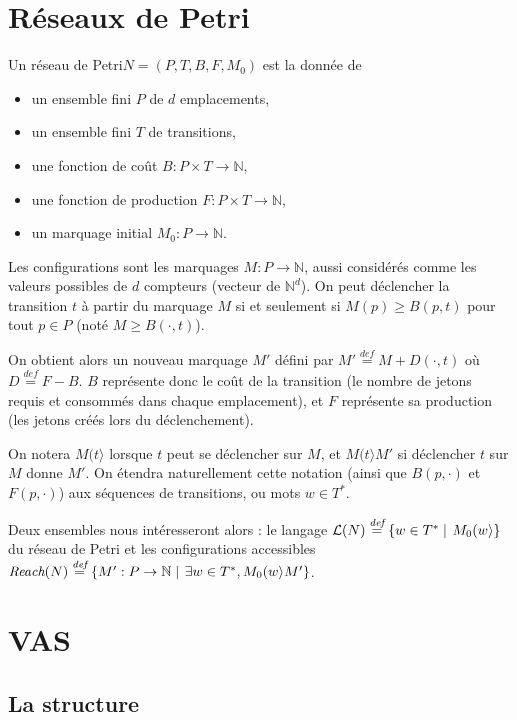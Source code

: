 \documentclass[a4paper,final]{article}
\theoremstyle{definition}
\let\geq\geqslant
\newcommand{\set}[2]{\left\{#1\mathrel{\left|\vphantom{#1}\vphantom{#2}\right.}#2\right\}}
\newcommand{\defeq}{\ensuremath{\stackrel{\textit{def}}{=}}}
\newcommand{\N}{\ensuremath{\mathbb{N}}}
\newcommand{\petri}{réseau de Petri\xspace}
\newcommand{\fire}[2]{\ensuremath{#1 (#2\rangle}}
\newcommand{\lang}{\ensuremath{\mathcal{L}}}
\newcommand{\reach}{\ensuremath{\textit{Reach}}}
\begin{document}
\section{Réseaux de Petri}

Un \petri $N = (P,T,B,F,M_0)$ est la donnée de
\begin{itemize}
    \item un ensemble fini $P$ de $d$ emplacements,
    \item un ensemble fini $T$ de transitions,
    \item une fonction de coût $B: P\times T\to\N$,
    \item une fonction de production $F: P\times T\to\N$,
    \item un marquage initial $M_0: P\to\N$.
\end{itemize}

Les configurations sont les marquages $M: P\to\N$, aussi considérés comme les valeurs possibles de $d$ compteurs (vecteur de $\N^d$).
On peut déclencher la transition $t$ à partir du marquage $M$ si et
seulement si $M(p)\geq B(p,t)$ pour tout $p\in P$ (noté $M\geq B(\cdot,t)$).

On obtient alors un nouveau marquage $M'$ défini par $M' \defeq M+D(\cdot,t)$ où $D\defeq F-B$. 
$B$ représente donc le coût de la transition (le nombre de jetons requis et consommés dans chaque emplacement), et $F$ représente sa production (les jetons créés lors du déclenchement).

On notera $\fire{M}{t}$ lorsque $t$ peut se déclencher sur $M$, et $\fire{M}{t}M'$ si déclencher $t$ sur $M$ donne $M'$.
On étendra naturellement cette notation (ainsi que $B(p,\cdot)$ et $F(p,\cdot)$) aux séquences de transitions, ou mots $w\in T^\ast$.

Deux ensembles nous intéresseront alors : le langage $\lang(N)\defeq \set{w\in T^\ast} {\fire{M_0}{w}}$ du \petri et les configurations accessibles $\reach(N)\defeq \set{M':P\to\N}{\exists w\in T^\ast, \fire{M_0}{w}M'}$.

\fi

\section{VAS}

\subsection{La structure}
\end{document}
